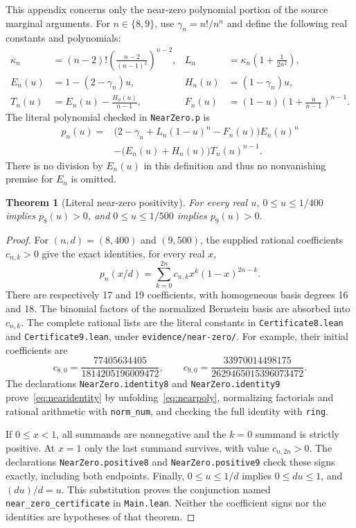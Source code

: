 \documentclass[11pt]{article}
\newtheorem{theorem}{Theorem}
\newcommand{\code}[1]{\texttt{\small #1}}
\begin{document}
This appendix concerns only the near-zero polynomial portion of the
source marginal arguments. For $n\in\{8,9\}$, use
$\gamma_n=n!/n^n$ and define the following real constants and polynomials:
\begin{align*}
 \kappa_n&=(n-2)!\left(\frac{n-2}{(n-1)^2}\right)^{n-2},
 &L_n&=\kappa_n\left(1+\frac{1}{2n^2}\right),\\
 E_n(u)&=1-(2-\gamma_n)u,
 &H_n(u)&=(1-\gamma_n)u,\\
 T_n(u)&=E_n(u)-\frac{H_n(u)}{n-1},
 &F_n(u)&=(1-u)\left(1+\frac{u}{n-1}\right)^{n-1}.
\end{align*}
The literal polynomial checked in \code{NearZero.p} is
\begin{equation}\label{eq:nearpoly}
\begin{split}
 p_n(u)={}&\bigl(2-\gamma_n+L_n(1-u)^n-F_n(u)\bigr)E_n(u)^n\\
          &-\bigl(E_n(u)+H_n(u)\bigr)T_n(u)^{n-1}.
\end{split}
\end{equation}
There is no division by $E_n(u)$ in this definition and thus no
nonvanishing premise for $E_n$ is omitted.

\begin{theorem}[Literal near-zero positivity]\label{thm:nearzero}
For every real $u$, $0\leq u\leq 1/400$ implies $p_8(u)>0$, and
$0\leq u\leq 1/500$ implies $p_9(u)>0$.
\end{theorem}

\begin{proof}
For $(n,d)=(8,400)$ and $(9,500)$, the supplied rational coefficients
$c_{n,k}>0$ give the exact identities, for every real $x$,
\begin{equation}\label{eq:nearidentity}
 p_n(x/d)=\sum_{k=0}^{2n}c_{n,k}x^k(1-x)^{2n-k}.
\end{equation}
There are respectively 17 and 19 coefficients, with homogeneous basis
degrees 16 and 18. The binomial factors of the normalized Bernstein
basis are absorbed into $c_{n,k}$. The complete rational lists are
the literal constants in \code{Certificate8.lean} and
\code{Certificate9.lean}, under \code{evidence/near-zero/}.
For example, their initial coefficients are
\[
 c_{8,0}=\frac{77405634405}{1814205196009472},\qquad
 c_{9,0}=\frac{33970014498175}{2629465015396073472}.
\]
The declarations \code{NearZero.identity8} and \code{NearZero.identity9}
prove~\eqref{eq:nearidentity} by unfolding~\eqref{eq:nearpoly},
normalizing factorials and rational arithmetic with \code{norm\_num},
and checking the full identity with \code{ring}.

If $0\leq x<1$, all summands are nonnegative and the $k=0$
summand is strictly positive. At $x=1$ only the last summand
survives, with value $c_{n,2n}>0$. The declarations
\code{NearZero.positive8} and \code{NearZero.positive9} check these
signs exactly, including both endpoints. Finally, $0\leq u\leq1/d$
implies $0\leq du\leq1$, and $(du)/d=u$. This substitution proves
the conjunction named \code{near\_zero\_certificate} in \code{Main.lean}.
Neither the coefficient signs nor the identities are hypotheses of
that theorem.
\end{proof}
\end{document}
